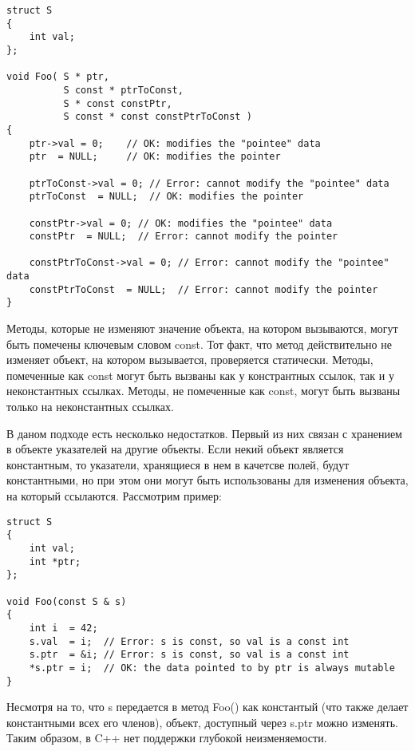 \begin{lstlisting}[caption=Константный указатель, label=code:const_pointer]
struct S
{ 
    int val;
};

void Foo( S * ptr,
          S const * ptrToConst,
          S * const constPtr,
          S const * const constPtrToConst )
{
    ptr->val = 0;    // OK: modifies the "pointee" data
    ptr  = NULL;     // OK: modifies the pointer
 
    ptrToConst->val = 0; // Error: cannot modify the "pointee" data
    ptrToConst  = NULL;  // OK: modifies the pointer
 
    constPtr->val = 0; // OK: modifies the "pointee" data
    constPtr  = NULL;  // Error: cannot modify the pointer
 
    constPtrToConst->val = 0; // Error: cannot modify the "pointee" data
    constPtrToConst  = NULL;  // Error: cannot modify the pointer
}
\end{lstlisting}

Методы, которые не изменяют значение объекта, на котором вызываются, могут быть помечены ключевым словом const. Тот факт, что метод действительно не изменяет объект, на котором вызывается, проверяется статически. Методы, помеченные как const могут быть вызваны как у констрантных ссылок, так и у неконстантных ссылках. Методы, не помеченные как const, могут быть вызваны только на неконстантных ссылках. 

В даном подходе есть несколько недостатков. Первый из них связан с хранением в объекте указателей на другие объекты. Если некий объект является константным, то указатели, хранящиеся в нем в качетсве полей, будут константными, но при этом они могут быть использованы для изменения объекта, на который ссылаются. Рассмотрим пример: 

\begin{lstlisting}[caption=Пример изменения значения по указателю в константном методе, label=code:pointer]
struct S
{ 
    int val;
    int *ptr;
};
 
void Foo(const S & s)
{
    int i  = 42;
    s.val  = i;  // Error: s is const, so val is a const int
    s.ptr  = &i; // Error: s is const, so val is a const int
    *s.ptr = i;  // OK: the data pointed to by ptr is always mutable
}
\end{lstlisting}

Несмотря на то, что s передается в метод Foo() как константый (что также делает константными всех его членов), объект, доступный через s.ptr можно изменять. Таким образом, в C++ нет поддержки глубокой неизменяемости.

